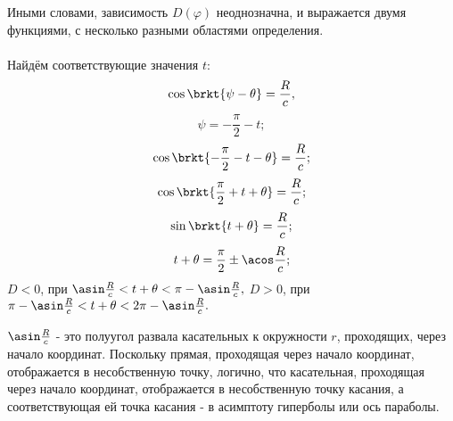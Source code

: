 Иными словами, зависимость $D(\varphi)$ неоднозначна, и выражается двумя функциями, с несколько разными областями определения.

\paragraph{}Найдём соответствующие значения $t$:
$$\cos\brkt{\psi - \theta} = \frac{R}{c},$$
$$\psi = -\frac{\pi}{2}-t;$$
$$\cos\brkt{-\frac{\pi}{2} - t - \theta} = \frac{R}{c};$$
$$\cos\brkt{\frac{\pi}{2} + t + \theta} = \frac{R}{c};$$
$$\sin\brkt{t + \theta} = \frac{R}{c};$$
$$t + \theta = \frac{\pi}{2} \pm \acos\frac{R}{c};$$
$D<0$, при $\asin\frac{R}{c} < t + \theta < \pi - \asin\frac{R}{c},$
$D>0$, при $\pi - \asin\frac{R}{c} < t + \theta < 2\pi - \asin\frac{R}{c}.$

$\asin\frac{R}{c}$ - это полуугол развала касательных к окружности $r$, проходящих, через начало координат. Поскольку прямая, проходящая через начало координат, отображается в несобственную точку, логично, что касательная, проходящая через начало координат, отображается в несобственную точку касания, а соответствующая ей точка касания - в асимптоту гиперболы или ось параболы.